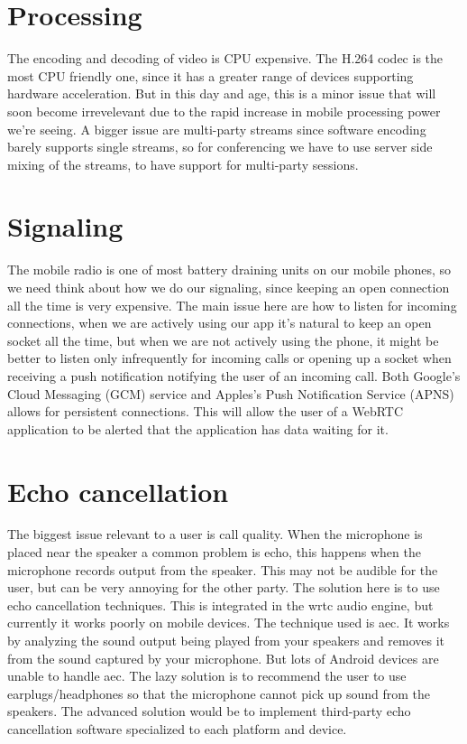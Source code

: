 \section{Processing}
The encoding and decoding of video is CPU expensive. The H.264 codec is the most CPU friendly one, since it has a greater range of devices supporting hardware acceleration. But in this day and age, this is a minor issue that will soon become irrevelevant due to the rapid increase in mobile processing power we're seeing\cite{moores-law}. A bigger issue are multi-party streams since software encoding barely supports single streams\cite{webrtc-mobile-slides}, so for conferencing we have to use server side mixing of the streams, to have support for multi-party sessions.


\section{Signaling}
The mobile radio is one of most battery draining units on our mobile phones, so we need think about how we do our signaling, since keeping an open connection all the time is very expensive. The main issue here are how to listen for incoming connections, when we are actively using our app it's natural to keep an open socket all the time, but when we are not actively using the phone, it might be better to listen only infrequently for incoming calls or opening up a socket when receiving a push notification notifying the user of an incoming call. Both Google's Cloud Messaging (GCM) service and Apples's Push Notification Service (APNS) allows for persistent connections. This will allow the user of a WebRTC application to be alerted that the application has data waiting for it.


\section{Echo cancellation}
The biggest issue relevant to a user is call quality. When the microphone is placed near the speaker a common problem is echo, this happens when the microphone records output from the speaker. This may not be audible for the user, but can be very annoying for the other party. The solution here is to use echo cancellation techniques. This is integrated in the \gls{wrtc} audio engine, but currently it works poorly on mobile devices. The technique used is \gls{aec}. It works by analyzing the sound output being played from your speakers and removes it from the sound captured by your microphone. But lots of Android devices are unable to handle \gls{aec}\cite{echo-problems-mobile}. The lazy solution is to recommend the user to use earplugs/headphones so that the microphone cannot pick up sound from the speakers. The advanced solution would be to implement third-party echo cancellation software specialized to each platform and device.


